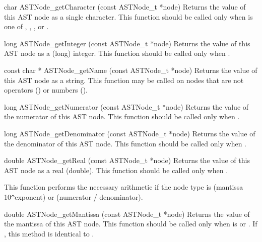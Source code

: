 \documentclass{sbmlmanual}
\begin{document}
\begin{methoddef}{char ASTNode\_getCharacter (const ASTNode\_t *node)}
  Returns the value of this AST node as a single character.  This function
  should be called only when  is one of
  , , ,
   or .
\end{methoddef}


\begin{methoddef}{long ASTNode\_getInteger (const ASTNode\_t *node)}
  Returns the value of this AST node as a (long) integer.  This function
  should be called only when .
\end{methoddef}


\begin{methoddef}{const char * ASTNode\_getName (const ASTNode\_t *node)}
  Returns the value of this AST node as a string.  This function may be
  called on nodes that are not operators () or numbers ().
\end{methoddef}


\begin{methoddef}{long ASTNode\_getNumerator (const ASTNode\_t *node)}
  Returns the value of the numerator of this AST node.  This function
  should be called only when .
\end{methoddef}


\begin{methoddef}{long ASTNode\_getDenominator (const ASTNode\_t *node)}
  Returns the value of the denominator of this AST node.  This function
  should be called only when .
\end{methoddef}


\begin{methoddef}{double ASTNode\_getReal (const ASTNode\_t *node)}
  Returns the value of this AST node as a real (double).  This function
  should be called only when .
 
  This function performs the necessary arithmetic if the node type is
   (mantissa  10\verb|^|exponent) or 
  (numerator / denominator).
\end{methoddef}


\begin{methoddef}{double ASTNode\_getMantissa (const ASTNode\_t *node)}
  Returns the value of the mantissa of this AST node.  This function should
  be called only when  is 
  or .  If , this method is identical to
  .
\end{methoddef}
\end{document}
